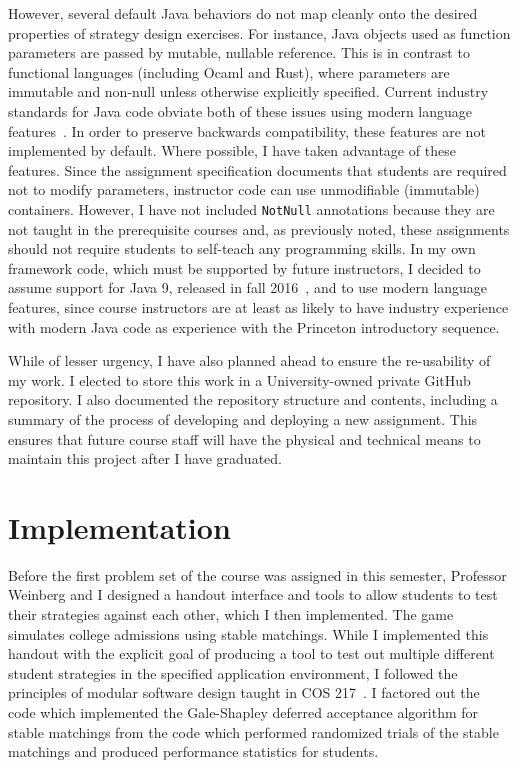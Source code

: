 \documentclass[pageno]{jpaper}
\begin{document}
However, several default Java behaviors do not map cleanly onto the desired properties of strategy design exercises.
For instance, Java objects used as function parameters are passed by mutable, nullable reference.
This is in contrast to functional languages (including Ocaml and Rust), where parameters are immutable and non-null unless otherwise explicitly specified.
Current industry standards for Java code obviate both of these issues using modern language features~\cite{guavanull, guavaimmutable, unmodlist}.
In order to preserve backwards compatibility, these features are not implemented by default.
Where possible, I have taken advantage of these features.
Since the assignment specification documents that students are required not to modify parameters, instructor code can use unmodifiable (immutable) containers.
However, I have not included \texttt{NotNull} annotations because they are not taught in the prerequisite courses and, as previously noted, these assignments should not require students to self-teach any programming skills.
In my own framework code, which must be supported by future instructors, I decided to assume support for Java 9, released in fall 2016~\cite{techworld}, and to use modern language features, since course instructors are at least as likely to have industry experience with modern Java code as experience with the Princeton introductory sequence.

While of lesser urgency, I have also planned ahead to ensure the re-usability of my work.
I elected to store this work in a University-owned private GitHub repository.
I also documented the repository structure and contents, including a summary of the process of developing and deploying a new assignment.
This ensures that future course staff will have the physical and technical means to maintain this project after I have graduated.

\section*{Implementation}
Before the first problem set of the course was assigned in this semester, Professor Weinberg and I designed a handout interface and tools to allow students to test their strategies against each other, which I then implemented.
The game simulates college admissions using stable matchings.
While I implemented this handout with the explicit goal of producing a tool to test out multiple different student strategies in the specified application environment, I followed the principles of modular software design taught in COS 217~\cite[Chapter~4]{tpop99}.
I factored out the code which implemented the Gale-Shapley deferred acceptance algorithm for stable matchings from the code which performed randomized trials of the stable matchings and produced performance statistics for students.
\end{document}
